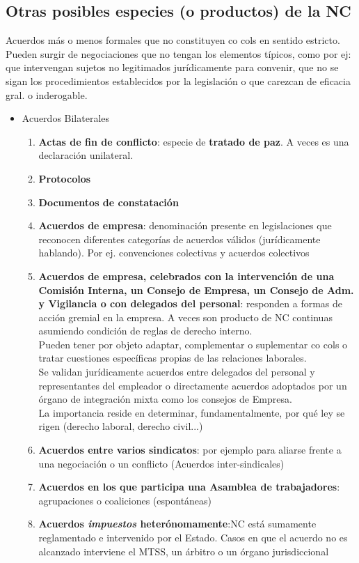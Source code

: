 \documentclass[spanish,12pt,a4paper,titlepage]{report}
\begin{document}
\subsection{Otras posibles especies (o productos) de la NC}
Acuerdos más o menos formales que no constituyen co cols en sentido estricto. Pueden surgir de negociaciones que no tengan los elementos típicos, como por ej: que intervengan sujetos no legitimados jurídicamente para convenir, que no se sigan los procedimientos establecidos por la legislación o que carezcan de eficacia gral. o inderogable.
\begin{itemize}
	\item Acuerdos Bilaterales
	\begin{enumerate}
		\item \textbf{Actas de fin de conflicto}: especie de \textbf{tratado de paz}. A veces es una declaración unilateral.
		\item \textbf{Protocolos}
		\item \textbf{Documentos de constatación}
		\item \textbf{Acuerdos de empresa}: denominación presente en legislaciones que reconocen diferentes categorías de acuerdos válidos (jurídicamente hablando). Por ej. convenciones colectivas y acuerdos colectivos
		\item \textbf{Acuerdos de empresa, celebrados con la intervención de una Comisión Interna, un Consejo de Empresa, un Consejo de Adm. y Vigilancia o con delegados del personal}: responden a formas de acción gremial en la empresa. A veces son producto de NC continuas asumiendo condición de reglas de derecho interno. \\Pueden tener por objeto adaptar, complementar o suplementar co cols o tratar cuestiones específicas propias de las relaciones laborales.\\ Se validan jurídicamente acuerdos entre delegados del personal y representantes del empleador o directamente acuerdos adoptados por un órgano de integración mixta como los consejos de Empresa.\\ La importancia reside en determinar, fundamentalmente, por qué ley se rigen (derecho laboral, derecho civil...)
		\item \textbf{Acuerdos entre varios sindicatos}: por ejemplo para aliarse frente a una negociación o un conflicto (Acuerdos inter-sindicales)
		\item \textbf{Acuerdos en los que participa una Asamblea de trabajadores}: agrupaciones o coaliciones (espontáneas)
		\item \textbf{Acuerdos \textit{impuestos} heterónomamente}:NC está sumamente reglamentado e intervenido por el Estado. Casos en que el acuerdo no es alcanzado interviene el MTSS, un árbitro o un órgano jurisdiccional

\end{enumerate}
\end{itemize}
\end{document}
